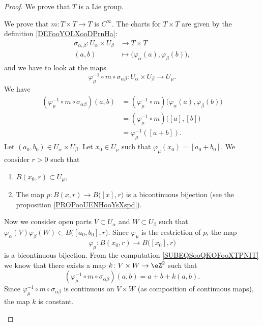 \begin{proof}
	We prove that \( T\) is a Lie group.
	\begin{subproof}
		We prove that \(m \colon T\times T\to T  \) is \( C^{\infty}\). The charts for \( T\times T\) are given by the definition \ref{DEFooYOLXooDPrnHa}:
		\begin{equation}
			\begin{aligned}
				\sigma_{\alpha,\beta}\colon U_{\alpha}\times U_{\beta} & \to T\times T                                               \\
				(a,b)                                                  & \mapsto \big( \varphi_{\alpha}(a),\varphi_{\beta}(b) \big),
			\end{aligned}
		\end{equation}
		and we have to look at the maps
		\begin{equation}
			\varphi_{\mu}^{-1}\circ m\circ \sigma_{\alpha\beta} \colon U_{\alpha}\times U_{\beta}\to U_{\mu}.
		\end{equation}
		We have
		\begin{subequations}	\label{SUBEQSooQKOFooXTPNIT}
			\begin{align}
				(\varphi_{\mu}^{-1}\circ m\circ \sigma_{\alpha\beta})(a,b) & =(\varphi_{\mu}^{-1}\circ m)\big( \varphi_{\alpha}(a),\varphi_{\beta}(b) \big) \\
				                                                           & =(\varphi_{\mu}^{-1}\circ m)\big( [a],[b] \big)                                \\
				                                                           & =\varphi_{\mu}^{-1}([a+b]).
			\end{align}
		\end{subequations}
		Let \( (a_0,b_0)\in U_{\alpha}\times U_{\beta}\). Let \( x_0\in U_{\mu}\) such that \( \varphi_{\mu}(x_0)=[a_0+b_0]\). We consider \( r>0\) such that
		\begin{enumerate}
			\item
			      \( B(x_0,r)\subset U_{\mu}\),
			\item
			      The map \(p \colon B(x,r)\to B\big( [x],r \big)  \) is a bicontinuous bijection (see the proposition \ref{PROPooUENHooYsXspd}).
		\end{enumerate}
		Now we consider open parts \( V\subset U_{\alpha}\) and \( W\subset U_{\beta}\) such that \( \varphi_{\alpha}(V)\varphi_{\beta}(W)\subset B\big( [a_0,b_0],r \big)\). Since \( \varphi_{\mu}\) is the restriction of \( p\), the map
		\begin{equation}
			\varphi_{\mu} \colon B(x_0,r)\to B\big( [x_0],r \big)
		\end{equation}
		is a bicontinuous bijection. From the computation \eqref{SUBEQSooQKOFooXTPNIT} we know that there exists a map \(k \colon V\times W\to \eZ^2  \) such that
		\begin{equation}
			(\varphi_{\mu}^{-1}\circ m \circ \sigma_{\alpha\beta})(a,b)=a+b+k(a,b).
		\end{equation}
		Since \( \varphi_{\mu}^{-1}\circ m\circ \sigma_{\alpha\beta}\) is continuous on \( V\times W\) (as composition of continuous maps), the map \( k\) is constant.


\end{subproof}
\end{proof}
